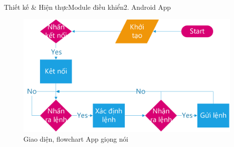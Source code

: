\documentclass[compress, blue, 13pt,hyperref={pdfpagemode=FullScreen}]{beamer}
\begin{document}
\begin{frame}{Thiết kế \& Hiện thực}{Module điều khiển}{2. Android App}
\begin{figure}[hbtp]
\includegraphics[scale=0.43]{images/flowchart_app.png}
\caption{Giao diện, flowchart App giọng nói}
\end{figure}
\end{frame}
\end{document}
